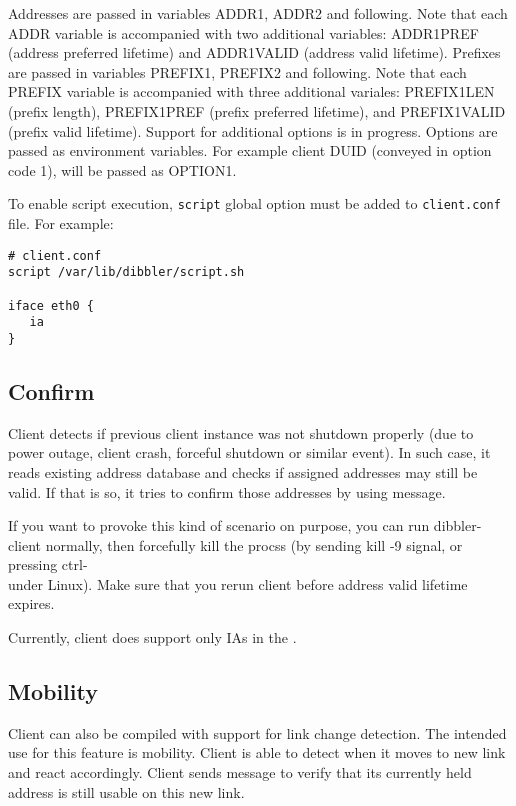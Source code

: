 \begin{enumerate}
Addresses are passed in variables ADDR1, ADDR2 and following. Note
that each ADDR variable is accompanied with two additional variables:
ADDR1PREF (address preferred lifetime) and ADDR1VALID (address valid
lifetime). Prefixes are passed in variables PREFIX1, PREFIX2 and
following. Note that each PREFIX variable is accompanied with three
additional variales: PREFIX1LEN (prefix length), PREFIX1PREF (prefix
preferred lifetime), and PREFIX1VALID (prefix valid lifetime). Support
for additional options is in progress. Options are passed as
environment variables. For example client DUID (conveyed in option
code 1), will be passed as OPTION1.

To enable script execution, \verb+script+ global option must
be added to \verb+client.conf+ file. For example:

\begin{lstlisting}
# client.conf
script /var/lib/dibbler/script.sh

iface eth0 {
   ia
}
\end{lstlisting}

\subsection{Confirm}
\label{feature-confirm}
Client detects if previous client instance was not shutdown properly
(due to power outage, client crash, forceful shutdown or similar
event). In such case, it reads existing address database and checks if
assigned addresses may still be valid. If that is so, it tries to
confirm those addresses by using  message.

If you want to provoke this kind of scenario on purpose, you can run
dibbler-client normally, then forcefully kill the procss (by sending
kill -9 signal, or pressing ctrl-\\ under Linux). Make sure that you
rerun client before address valid lifetime expires.

Currently, client does support only IAs in the .

\subsection{Mobility}
Client can also be compiled with support for link change detection.
The intended use for this feature is mobility. Client is able to
detect when it moves to new link and react accordingly. Client sends
 message to verify that its currently held address is
still usable on this new link.


\end{enumerate}
